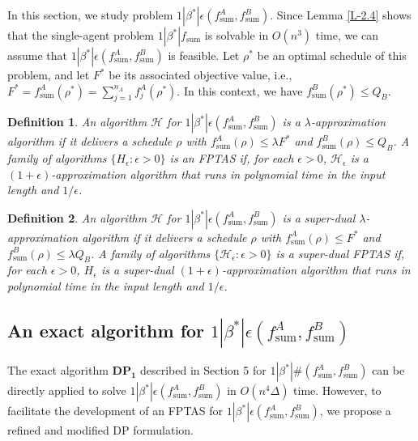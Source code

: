 \documentclass[12pt]{article}
\newtheorem{definition}{Definition}[section]
\begin{document}
\begin{sloppypar}
In this section, we study problem $1 | \beta^{*}|\epsilon(f_{\mathrm{sum}}^A, f_{\mathrm{sum}}^B)$. Since Lemma \ref{L-2.4} shows that the single-agent problem $1 | \beta^{*} | f_{\mathrm{sum}}$ is solvable in $O(n^3)$ time, we can assume that $1 | \beta^{*}|\epsilon(f_{\mathrm{sum}}^A, f_{\mathrm{sum}}^B)$ is feasible. Let $\rho^{*}$ be an optimal schedule of this problem, and let $F^{*}$ be its associated objective value, i.e., $F^{*}=f_{\mathrm{sum}}^A(\rho^{*})=\sum_{j=1}^{n_A} f_j^A(\rho^{*})$. In this context, we have $f_{\mathrm{sum}}^B(\rho^{*}) \leq Q_B$.

\begin{definition} \label{D-6.1}
An algorithm $\mathcal{H}$ for $1 | \beta^{*}|\epsilon(f_{\mathrm{sum}}^A, f_{\mathrm{sum}}^B)$ is a $\lambda$-approximation algorithm if it delivers a schedule $\rho$ with $f_{\mathrm{sum}}^A(\rho) \leq \lambda F^{*}$ and $f_{\mathrm{sum}}^B(\rho) \leq Q_B$. A family of algorithms $\{H_\epsilon: \epsilon >0\}$ is  an FPTAS if, for
each $\epsilon  > 0$, $\mathcal{H}_\epsilon$ is a $(1+\epsilon)$-approximation algorithm that runs in
polynomial time in the input length and $1/\epsilon$.
\end{definition}

\begin{definition} \label{D-6.2}
An algorithm $\mathcal{H}$ for $1 | \beta^{*}|\epsilon(f_{\mathrm{sum}}^A, f_{\mathrm{sum}}^B)$ is a super-dual $\lambda$-approximation
algorithm if it delivers a schedule $\rho$ with $f_{\mathrm{sum}}^A(\rho) \leq F^{*}$ and
$f_{\mathrm{sum}}^B(\rho) \leq \lambda Q_B$. A family of algorithms $\{\mathcal{H}_\epsilon: \epsilon >0\}$ is a super-dual FPTAS if, for
each $\epsilon  > 0$, $H_\epsilon$ is a super-dual $(1+\epsilon)$-approximation algorithm that runs in
polynomial time in the input length and $1/\epsilon$.
\end{definition}

\subsection{An exact algorithm for $1 | \beta^{*}|\epsilon(f_{\mathrm{sum}}^A, f_{\mathrm{sum}}^B)$}

The exact algorithm $\mathbf{DP_1}$ described in Section 5 for $1 |\beta^{*}|\#(f_{\mathrm{sum}}^A, f_{\mathrm{sum}}^B)$ can be directly applied to solve $1 | \beta^{*}|\epsilon(f_{\mathrm{sum}}^A, f_{\mathrm{sum}}^B)$ in $O(n^4 \Delta)$ time.  However, to facilitate the development of an FPTAS for $1 | \beta^{*}|\epsilon(f_{\mathrm{sum}}^A, f_{\mathrm{sum}}^B)$, we propose a refined and modified DP formulation.


\end{sloppypar}
\end{document}
